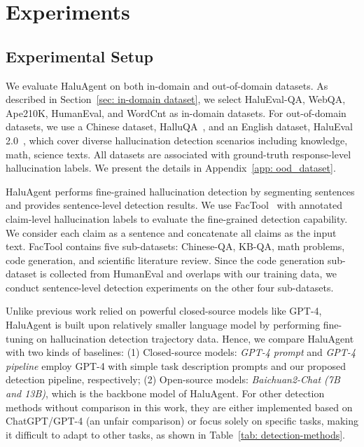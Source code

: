 \section{Experiments}


\subsection{Experimental Setup}

We evaluate HaluAgent on both in-domain and out-of-domain datasets. As described in Section~\ref{sec: in-domain dataset}, we select HaluEval-QA, WebQA, Ape210K, HumanEval, and WordCnt as in-domain datasets. For out-of-domain datasets, we use a Chinese dataset, HalluQA~\cite{cheng2023evaluating}, and an English dataset, HaluEval 2.0~\cite{li2024dawn}, which cover diverse hallucination detection scenarios including knowledge, math, science texts. 
All datasets are associated with ground-truth response-level hallucination labels. We present the details in Appendix~\ref{app: ood_dataset}.

HaluAgent performs fine-grained hallucination detection by segmenting sentences and provides sentence-level detection results. We use FacTool~\cite{chern2023factool} with annotated claim-level hallucination labels to evaluate the fine-grained detection capability. We consider each claim as a sentence and concatenate all claims as the input text. FacTool contains five sub-datasets: Chinese-QA, KB-QA, math problems, code generation, and scientific literature review. Since the code generation sub-dataset is collected from HumanEval and overlaps with our training data, we conduct sentence-level detection experiments on the other four sub-datasets. 

Unlike previous work relied on powerful closed-source models like GPT-4, HaluAgent is built upon relatively smaller language model by performing fine-tuning on hallucination detection trajectory data.
Hence, we compare HaluAgent with two kinds of baselines: (1) Closed-source models: \emph{GPT-4 prompt} and \emph{GPT-4 pipeline} employ GPT-4 with simple task description prompts and our proposed detection pipeline, respectively; (2) Open-source models: \emph{Baichuan2-Chat (7B and 13B)}, which is the backbone model of HaluAgent. For other detection methods without comparison in this work, they are either implemented based on ChatGPT/GPT-4 (an unfair comparison) or focus solely on specific tasks, making it difficult to adapt to other tasks, as shown in Table~\ref{tab: detection-methods}.


